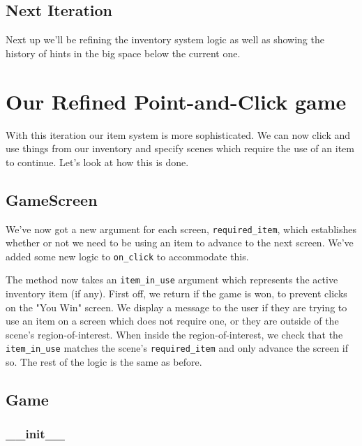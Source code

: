 \documentclass[a4paper,11pt,openany]{book}
\begin{document}
\subsection{Next Iteration}

Next up we'll be refining the inventory system logic as well as showing the history of hints in the big space below the current one. 

\newpage

\section{Our Refined Point-and-Click game}

With this iteration our item system is more sophisticated. We can now click and use things from our inventory and specify scenes which require the use of an item to continue. Let's look at how this is done.



\subsection{GameScreen}

We've now got a new argument for each screen, \lstinline[columns=fixed]{required_item}, which establishes whether or not we need to be using an item to advance to the next screen. We've added some new logic to \lstinline[columns=fixed]{on_click} to accommodate this. 

\vspace{5mm}

The method now takes an \lstinline[columns=fixed]{item_in_use} argument which represents the active inventory item (if any). First off, we return if the game is won, to prevent clicks on the "You Win" screen. We display a message to the user if they are trying to use an item on a screen which does not require one, or they are outside of the scene's region-of-interest. When inside the region-of-interest, we check that the \lstinline[columns=fixed]{item_in_use} matches the scene's \lstinline[columns=fixed]{required_item} and only advance the screen if so. The rest of the logic is the same as before. 

\subsection{Game}

\subsubsection{\_\_init\_\_}
\end{document}
